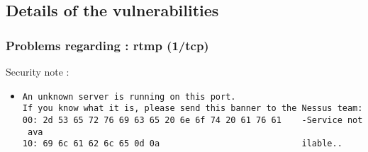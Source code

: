 \documentclass{article}
\begin{document}
\subsection{Details of the vulnerabilities}
\subsubsection{Problems regarding : rtmp (1/tcp)}
Security note :\\
\begin{itemize}
\item \begin{verbatim}
An unknown server is running on this port.
If you know what it is, please send this banner to the Nessus team:
00: 2d 53 65 72 76 69 63 65 20 6e 6f 74 20 61 76 61    -Service not
 ava
10: 69 6c 61 62 6c 65 0d 0a                            ilable..       
                 



\end{verbatim}\end{itemize}
\end{document}
